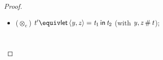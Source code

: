\begin{proof}
\begin{itemize}
\begin{gather*}
\begin{align*}
\begin{array}{rcrlll}
\textit{(defn. interp [rhs])} & \Rightarrow &  \langle   \textcolor{LGcolor}{\llparenthesis} \smidge   [  \SYSTEMnt{t}  /  \SYSTEMmv{x}  ]  \SYSTEMnt{t_{{\mathrm{1}}}}   \smidge \textcolor{LGcolor}{\rrparenthesis}  ,   \textcolor{LGcolor}{\llparenthesis} \smidge   [  \SYSTEMnt{t}  /  \SYSTEMmv{x}  ]  \SYSTEMnt{t_{{\mathrm{2}}}}   \smidge \textcolor{LGcolor}{\rrparenthesis}   \rangle  & \eqStep &  [   \textcolor{LGcolor}{\llparenthesis} \smidge  \SYSTEMnt{t}  \smidge \textcolor{LGcolor}{\rrparenthesis}   /  \SYSTEMmv{x}  ]   \langle   \textcolor{LGcolor}{\llparenthesis} \smidge  \SYSTEMnt{t_{{\mathrm{1}}}}  \smidge \textcolor{LGcolor}{\rrparenthesis}  ,   \textcolor{LGcolor}{\llparenthesis} \smidge  \SYSTEMnt{t_{{\mathrm{2}}}}  \smidge \textcolor{LGcolor}{\rrparenthesis}   \rangle   \\
\textit{(defn. subst [rhs])} & \Rightarrow &  \langle   \textcolor{LGcolor}{\llparenthesis} \smidge   [  \SYSTEMnt{t}  /  \SYSTEMmv{x}  ]  \SYSTEMnt{t_{{\mathrm{1}}}}   \smidge \textcolor{LGcolor}{\rrparenthesis}  ,   \textcolor{LGcolor}{\llparenthesis} \smidge   [  \SYSTEMnt{t}  /  \SYSTEMmv{x}  ]  \SYSTEMnt{t_{{\mathrm{2}}}}   \smidge \textcolor{LGcolor}{\rrparenthesis}   \rangle  & \eqStep &  \langle   [   \textcolor{LGcolor}{\llparenthesis} \smidge  \SYSTEMnt{t}  \smidge \textcolor{LGcolor}{\rrparenthesis}   /  \SYSTEMmv{x}  ]   \textcolor{LGcolor}{\llparenthesis} \smidge  \SYSTEMnt{t_{{\mathrm{1}}}}  \smidge \textcolor{LGcolor}{\rrparenthesis}   ,   [   \textcolor{LGcolor}{\llparenthesis} \smidge  \SYSTEMnt{t}  \smidge \textcolor{LGcolor}{\rrparenthesis}   /  \SYSTEMmv{x}  ]   \textcolor{LGcolor}{\llparenthesis} \smidge  \SYSTEMnt{t_{{\mathrm{2}}}}  \smidge \textcolor{LGcolor}{\rrparenthesis}    \rangle  \\
\textit{(induction on $\SYSTEMnt{t_{{\mathrm{1}}}}$ and $\SYSTEMnt{t_{{\mathrm{2}}}}$)} & \Rightarrow & \top
\end{array}
\end{align*}
\end{gather*}
%
\item ($\otimes_e$) $\SYSTEMnt{t'} \equiv  \mathsf{let} \, \langle  \SYSTEMmv{y} ,  \SYSTEMmv{z}  \rangle =  \SYSTEMnt{t_{{\mathrm{1}}}}  \, \mathsf{in} \,  \SYSTEMnt{t_{{\mathrm{2}}}} $ (with $ \mathit{y} ,   \mathit{z}  \,\#\,  \mathit{t}  $);
%
\begin{gather*}
\begin{align*}
\begin{array}{rcrlll}

\end{array}
\end{align*}
\end{gather*}
\end{itemize}
\end{proof}
